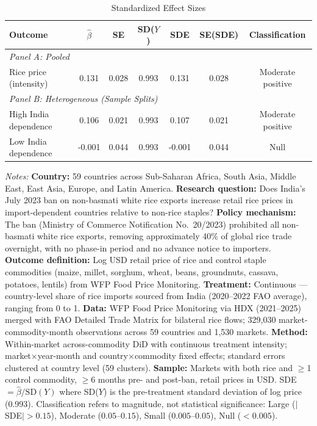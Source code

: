 \begin{table}[htbp]
\centering
\caption{Standardized Effect Sizes}
\label{tab:sde}
\begin{threeparttable}
\begin{tabular}{lcccccc}
\hline\hline
Outcome & $\hat{\beta}$ & SE & SD($Y$) & SDE & SE(SDE) & Classification \\
\hline
\multicolumn{7}{l}{\textit{Panel A: Pooled}} \\
Rice price (intensity) & 0.131 & 0.028 & 0.993 & 0.131 & 0.028 & Moderate positive \\
\hline
\multicolumn{7}{l}{\textit{Panel B: Heterogeneous (Sample Splits)}} \\
High India dependence & 0.106 & 0.021 & 0.993 & 0.107 & 0.021 & Moderate positive \\
Low India dependence & -0.001 & 0.044 & 0.993 & -0.001 & 0.044 & Null \\
\hline\hline
\end{tabular}
\begin{tablenotes}[flushleft]\small
\item \textit{Notes:} \textbf{Country:} 59 countries across Sub-Saharan Africa, South Asia, Middle East, East Asia, Europe, and Latin America. \textbf{Research question:} Does India's July 2023 ban on non-basmati white rice exports increase retail rice prices in import-dependent countries relative to non-rice staples? \textbf{Policy mechanism:} The ban (Ministry of Commerce Notification No.\ 20/2023) prohibited all non-basmati white rice exports, removing approximately 40\% of global rice trade overnight, with no phase-in period and no advance notice to importers. \textbf{Outcome definition:} Log USD retail price of rice and control staple commodities (maize, millet, sorghum, wheat, beans, groundnuts, cassava, potatoes, lentils) from WFP Food Price Monitoring. \textbf{Treatment:} Continuous --- country-level share of rice imports sourced from India (2020--2022 FAO average), ranging from 0 to 1. \textbf{Data:} WFP Food Price Monitoring via HDX (2021--2025) merged with FAO Detailed Trade Matrix for bilateral rice flows; 329,030 market-commodity-month observations across 59 countries and 1,530 markets. \textbf{Method:} Within-market across-commodity DiD with continuous treatment intensity; market$\times$year-month and country$\times$commodity fixed effects; standard errors clustered at country level (59 clusters). \textbf{Sample:} Markets with both rice and $\geq$1 control commodity, $\geq$6 months pre- and post-ban, retail prices in USD. SDE $= \hat{\beta} / \text{SD}(Y)$ where SD($Y$) is the pre-treatment standard deviation of log price (0.993). Classification refers to magnitude, not statistical significance: Large ($|$SDE$| > 0.15$), Moderate ($0.05$--$0.15$), Small ($0.005$--$0.05$), Null ($< 0.005$). 
\end{tablenotes}
\end{threeparttable}
\end{table}

